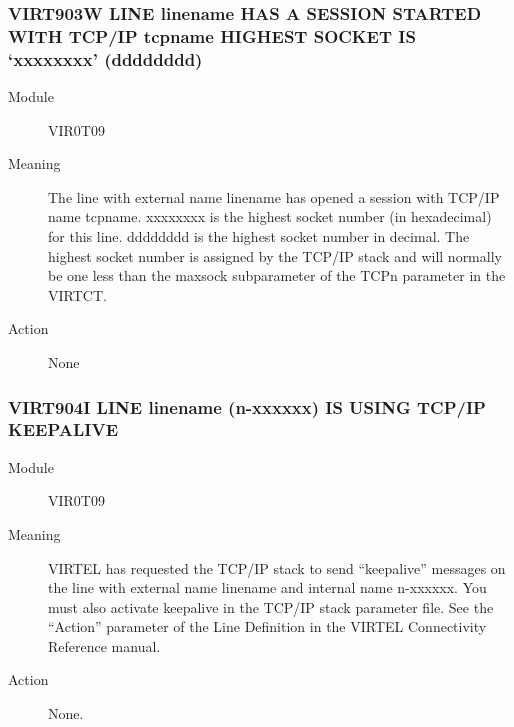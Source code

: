 \documentclass[letterpaper,10pt,english]{sphinxmanual}
\begin{document}
\subsubsection{VIRT903W LINE linename HAS A SESSION STARTED WITH TCP/IP tcpname HIGHEST SOCKET IS ‘xxxxxxxx’ (dddddddd)}
\label{\detokenize{messages:virt903w-line-linename-has-a-session-started-with-tcp-ip-tcpname-highest-socket-is-xxxxxxxx-dddddddd}}\begin{description}
\item[{Module}] \leavevmode
VIR0T09

\item[{Meaning}] \leavevmode
The line with external name linename has opened a session with TCP/IP name tcpname. xxxxxxxx is the highest socket number (in hexadecimal) for this line. dddddddd is the highest socket number in decimal. The highest socket number is assigned by the TCP/IP stack and will normally be one less than the maxsock subparameter of the TCPn parameter in the VIRTCT.

\item[{Action}] \leavevmode
None

\end{description}


\subsubsection{VIRT904I LINE linename (n-xxxxxx) IS USING TCP/IP KEEPALIVE}
\label{\detokenize{messages:virt904i-line-linename-n-xxxxxx-is-using-tcp-ip-keepalive}}\begin{description}
\item[{Module}] \leavevmode
VIR0T09

\item[{Meaning}] \leavevmode
VIRTEL has requested the TCP/IP  stack to send “keepalive” messages on the line with external name linename and internal name n-xxxxxx. You must also activate keepalive in the TCP/IP stack parameter file. See the “Action” parameter of the Line Definition in the VIRTEL Connectivity Reference manual.

\item[{Action}] \leavevmode
None.

\end{description}
\end{document}
